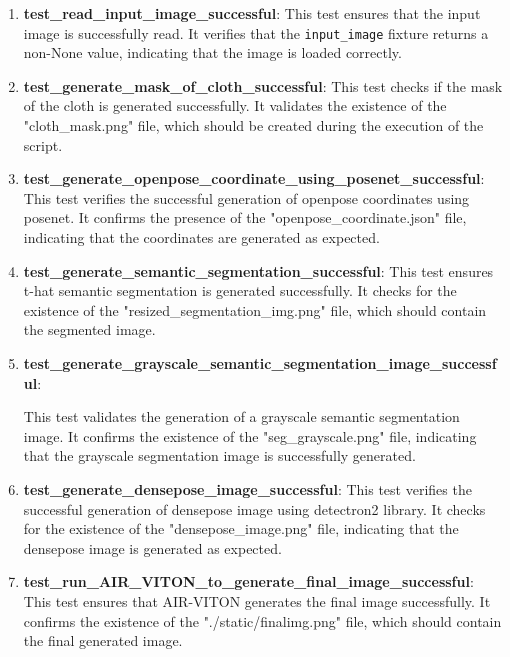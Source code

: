     \begin{enumerate}
        \item \textbf{test\_read\_input\_image\_successful}: This test ensures that the input image is successfully read. It verifies that the \texttt{input\_image} fixture returns a non-None value, indicating that the image is loaded correctly.
        
        \item \textbf{test\_generate\_mask\_of\_cloth\_successful}: This test checks if the mask of the cloth is generated successfully. It validates the existence of the "cloth\_mask.png" file, which should be created during the execution of the script.
        
        \item \textbf{test\_generate\_openpose\_coordinate\_using\_posenet\_successful}: This test verifies the successful generation of openpose coordinates using posenet. It confirms the presence of the "openpose\_coordinate.json" file, indicating that the coordinates are generated as expected.
        
        \item \textbf{test\_generate\_semantic\_segmentation\_successful}: This test ensures t-hat semantic segmentation is generated successfully. It checks for the existence of the "resized\_segmentation\_img.png" file, which should contain the segmented image.
        
        \item \textbf{test\_generate\_grayscale\_semantic\_segmentation\_image\_successful}: 
        
        This test validates the generation of a grayscale semantic segmentation image. It confirms the existence of the "seg\_grayscale.png" file, indicating that the grayscale segmentation image is successfully generated.
        
        \item \textbf{test\_generate\_densepose\_image\_successful}: This test verifies the successful generation of densepose image using detectron2 library. It checks for the existence of the "densepose\_image.png" file, indicating that the densepose image is generated as expected.
        
        \item \textbf{test\_run\_AIR\_VITON\_to\_generate\_final\_image\_successful}: This test ensures that AIR-VITON generates the final image successfully. It confirms the existence of the "./static/finalimg.png" file, which should contain the final generated image.
        

\end{enumerate}
